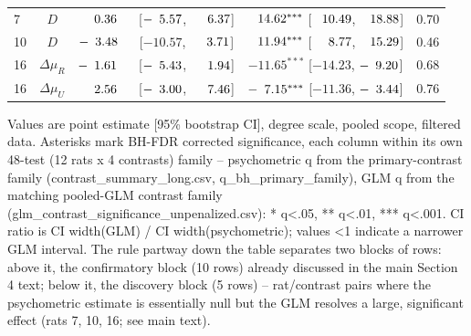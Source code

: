 \begin{table}[htbp]
{\begin{tabular}{lcccc}
7 & $D$ & $\hphantom{-}\hphantom{0}0.36^{\hphantom{***}}$ [$-\hphantom{0}5.57$, $\hphantom{-}\hphantom{0}6.37$] & $\hphantom{-}14.62^{***}$ [$\hphantom{-}10.49$, $\hphantom{-}18.88$] & 0.70 \\
10 & $D$ & $-\hphantom{0}3.48^{\hphantom{***}}$ [$-10.57$, $\hphantom{-}\hphantom{0}3.71$] & $\hphantom{-}11.94^{***}$ [$\hphantom{-}\hphantom{0}8.77$, $\hphantom{-}15.29$] & 0.46 \\
16 & $\Delta\mu_{R}$ & $-\hphantom{0}1.61^{\hphantom{***}}$ [$-\hphantom{0}5.43$, $\hphantom{-}\hphantom{0}1.94$] & $-11.65^{***}$ [$-14.23$, $-\hphantom{0}9.20$] & 0.68 \\
16 & $\Delta\mu_{U}$ & $\hphantom{-}\hphantom{0}2.56^{\hphantom{***}}$ [$-\hphantom{0}3.00$, $\hphantom{-}\hphantom{0}7.46$] & $-\hphantom{0}7.15^{***}$ [$-11.36$, $-\hphantom{0}3.44$] & 0.76 \\
\bottomrule
\end{tabular}
}
\vspace{4pt}
\par\noindent
\begin{minipage}{\linewidth}\small Values are point estimate [95\% bootstrap CI], degree scale, pooled scope, filtered data. Asterisks mark BH-FDR corrected significance, each column within its own 48-test (12 rats x 4 contrasts) family -- psychometric q from the primary-contrast family (contrast\_summary\_long.csv, q\_bh\_primary\_family), GLM q from the matching pooled-GLM contrast family (glm\_contrast\_significance\_unpenalized.csv): * q<.05, ** q<.01, *** q<.001. CI ratio is CI width(GLM) / CI width(psychometric); values <1 indicate a narrower GLM interval. The rule partway down the table separates two blocks of rows: above it, the confirmatory block (10 rows) already discussed in the main Section 4 text; below it, the discovery block (5 rows) -- rat/contrast pairs where the psychometric estimate is essentially null but the GLM resolves a large, significant effect (rats 7, 10, 16; see main text).\end{minipage}
\end{table}